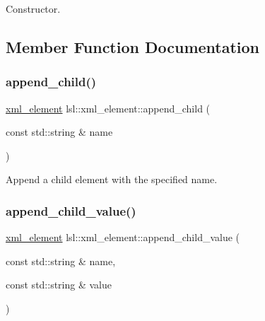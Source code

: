 Constructor. 



\subsection{Member Function Documentation}
\mbox{\label{classlsl_1_1xml__element_af56c7976bb62cabc9c0ca69502063fea}} 
\subsubsection{\texorpdfstring{append\+\_\+child()}{append\_child()}}
{\footnotesize\ttfamily \hyperlink{classlsl_1_1xml__element}{xml\+\_\+element} lsl\+::xml\+\_\+element\+::append\+\_\+child (\begin{DoxyParamCaption}\item[{const std\+::string \&}]{name }\end{DoxyParamCaption})\hspace{0.3cm}{\ttfamily [inline]}}



Append a child element with the specified name. 

\mbox{\label{classlsl_1_1xml__element_a6a162d1b57049f5ecab6b68207a71d53}} 
\subsubsection{\texorpdfstring{append\+\_\+child\+\_\+value()}{append\_child\_value()}}
{\footnotesize\ttfamily \hyperlink{classlsl_1_1xml__element}{xml\+\_\+element} lsl\+::xml\+\_\+element\+::append\+\_\+child\+\_\+value (\begin{DoxyParamCaption}\item[{const std\+::string \&}]{name,  }\item[{const std\+::string \&}]{value }\end{DoxyParamCaption})\hspace{0.3cm}{\ttfamily [inline]}}

